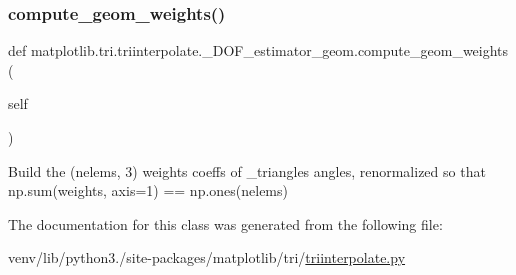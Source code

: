 \subsubsection{\texorpdfstring{compute\+\_\+geom\+\_\+weights()}{compute\_geom\_weights()}}
{\footnotesize\ttfamily def matplotlib.\+tri.\+triinterpolate.\+\_\+\+D\+O\+F\+\_\+estimator\+\_\+geom.\+compute\+\_\+geom\+\_\+weights (\begin{DoxyParamCaption}\item[{}]{self }\end{DoxyParamCaption})}

\begin{DoxyVerb}Build the (nelems, 3) weights coeffs of _triangles angles,
renormalized so that np.sum(weights, axis=1) == np.ones(nelems)
\end{DoxyVerb}
 

The documentation for this class was generated from the following file\+:\begin{DoxyCompactItemize}
\item 
venv/lib/python3./site-\/packages/matplotlib/tri/\hyperlink{triinterpolate_8py}{triinterpolate.\+py}\end{DoxyCompactItemize}
